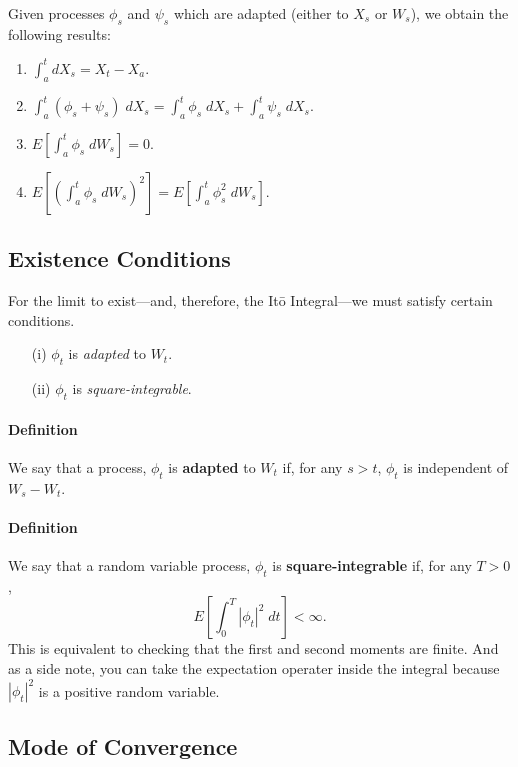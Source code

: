 \documentclass[12pt]{article}
\theoremstyle{plain}
\theoremstyle{definition}
\theoremstyle{remark}
\begin{document}
Given processes $\phi_s$ and $\psi_s$ which are adapted (either to
$X_s$ or $W_s$), we obtain the following results:
\begin{enumerate}
   \item{$\int_a^t dX_s = X_t - X_a$.}
   \item{$\int_a^t (\phi_s + \psi_s)\; dX_s = \int_a^t \phi_s \; dX_s +
      \int_a^t \psi_s \; dX_s$.}
   \item{$E\left[\int_a^t \phi_s \;dW_s \right] = 0$.}
   \item{$E\left[\left(\int_a^t \phi_s \;dW_s\right)^2 \right] =
      E\left[\int_a^t \phi^2_s \;dW_s \right]$.}
\end{enumerate}




\subsection{Existence Conditions}

For the limit to exist---and, therefore, the It\={o} Integral---we must
satisfy certain conditions.
\begin{enumerate}[]
   \item[(i)]{$\phi_t$ is \emph{adapted} to $W_t$.}
   \item[(ii)]{$\phi_t$ is \emph{square-integrable}.}
\end{enumerate}

\paragraph{Definition} We say that a process, $\phi_t$ is
\textbf{adapted} to $W_t$ if, for any $s > t$, $\phi_t$ is independent
of $W_s - W_t$.

\paragraph{Definition} We say that a random variable process, $\phi_t$ is
\textbf{square-integrable} if, for any $T>0$,
   \[E \left[ \int^T_0 |\phi_t|^2 \; dt \right] < \infty.\]
This is equivalent to checking that the first and second moments are
finite.
And as a side note, you can take the expectation operater inside the
integral because $|\phi_t|^2$ is a positive random variable.

\subsection{Mode of Convergence}
\end{document}
